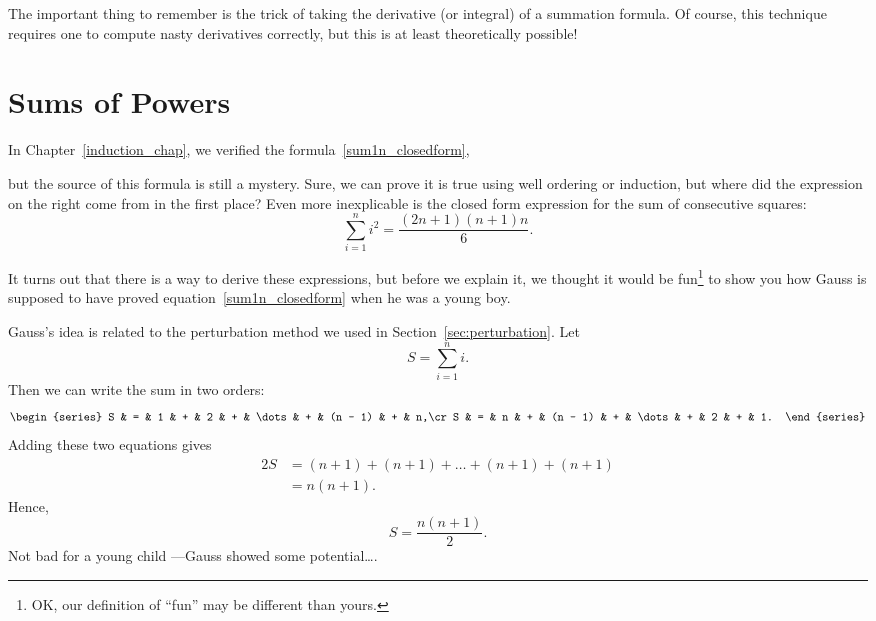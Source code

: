 The important thing to remember is the trick of taking the derivative
(or integral) of a summation formula.  Of course, this technique
requires one to compute nasty derivatives correctly, but this is at
least theoretically possible!

\begin{problems}
\classproblems
{}

\homeworkproblems
{}

\end{problems}

\section{Sums of Powers}

In Chapter~\ref{induction_chap}, we verified the formula~\eqref{sum1n_closedform},

but the source of this formula is still a mystery.  Sure, we can prove
it is true using well ordering or induction, but where did the
expression on the right come from in the first place?  Even more
inexplicable is the closed form expression for the sum of consecutive
squares:
\begin{equation}\label{eqn:G27}
    \sum_{i = 1}^n i^2 = \frac{(2n+1) (n+1) n}{6}.
\end{equation}

It turns out that there is a way to derive these expressions, but
before we explain it, we thought it would be fun\footnote{OK, our
  definition of ``fun'' may be different than yours.} to show you how
Gauss is supposed to have proved equation~\ref{sum1n_closedform} when
he was a young boy.

Gauss's idea is related to the perturbation method we used in
Section~\ref{sec:perturbation}.  Let
\[
    S = \sum_{i = 1}^n i.
\]
Then we can write the sum in two orders:
\[
    \begin{series}
        S & = & 1 & + & 2       & + & \dots & + & (n - 1) & + & n,\cr
        S & = & n & + & (n - 1) & + & \dots & + & 2       & + & 1.
    \end{series}
\]
Adding these two equations gives
\begin{align*}
    2S  & = (n + 1) + (n + 1) + \dots + (n + 1) + (n + 1) \\
        & = n (n + 1).
\end{align*}
Hence,
\[
    S = \frac{n (n + 1)}{2}.
\]
Not bad for a young child ---Gauss showed some potential\dots.

